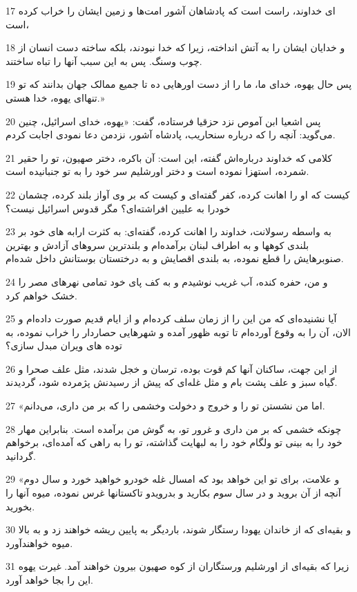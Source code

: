 \par 17 ‌ای خداوند، راست است که پادشاهان آشور امت‌ها و زمین ایشان را خراب کرده است،
\par 18 و خدایان ایشان را به آتش انداخته، زیرا که خدا نبودند، بلکه ساخته دست انسان از چوب وسنگ. پس به این سبب آنها را تباه ساختند.
\par 19 پس حال یهوه، خدای ما، ما را از دست اورهایی ده تا جمیع ممالک جهان بدانند که تو تنهاای یهوه، خدا هستی.»
\par 20 پس اشعیا ابن آموص نزد حزقیا فرستاده، گفت: «یهوه، خدای اسرائیل، چنین می‌گوید: آنچه را که درباره سنحاریب، پادشاه آشور، نزدمن دعا نمودی اجابت کردم.
\par 21 کلامی که خداوند درباره‌اش گفته، این است: آن باکره، دختر صهیون، تو را حقیر شمرده، استهزا نموده است و دختر اورشلیم سر خود را به تو جنبانیده است.
\par 22 کیست که او را اهانت کرده، کفر گفته‌ای و کیست که بر وی آواز بلند کرده، چشمان خودرا به علیین افراشته‌ای؟ مگر قدوس اسرائیل نیست؟
\par 23 به واسطه رسولانت، خداوند را اهانت کرده، گفته‌ای: به کثرت ارابه های خود بر بلندی کوهها و به اطراف لبنان برآمده‌ام و بلندترین سروهای آزادش و بهترین صنوبرهایش را قطع نموده، به بلندی اقصایش و به درختستان بوستانش داخل شده‌ام.
\par 24 و من، حفره کنده، آب غریب نوشیدم و به کف پای خود تمامی نهرهای مصر را خشک خواهم کرد.
\par 25 آیا نشنیده‌ای که من این را از زمان سلف کرده‌ام و از ایام قدیم صورت داده‌ام و الان، آن را به وقوع آورده‌ام تا توبه ظهور آمده و شهرهایی حصاردار را خراب نموده، به توده های ویران مبدل سازی؟
\par 26 از این جهت، ساکنان آنها کم قوت بوده، ترسان و خجل شدند، مثل علف صحرا و گیاه سبز و علف پشت بام و مثل غله‌ای که پیش از رسیدنش پژمرده شود، گردیدند.
\par 27 «اما من نشستن تو را و خروج و دخولت وخشمی را که بر من داری، می‌دانم.
\par 28 چونکه خشمی که بر من داری و غرور تو، به گوش من برآمده است. بنابراین مهار خود را به بینی تو ولگام خود را به لبهایت گذاشته، تو را به راهی که آمده‌ای، برخواهم گردانید.
\par 29 «و علامت، برای تو این خواهد بود که امسال غله خودرو خواهید خورد و سال دوم آنچه از آن بروید و در سال سوم بکارید و بدرویدو تاکستانها غرس نموده، میوه آنها را بخورید.
\par 30 و بقیه‌ای که از خاندان یهودا رستگار شوند، باردیگر به پایین ریشه خواهند زد و به بالا میوه خواهند‌آورد.
\par 31 زیرا که بقیه‌ای از اورشلیم ورستگاران از کوه صهیون بیرون خواهند آمد. غیرت یهوه این را بجا خواهد آورد.
